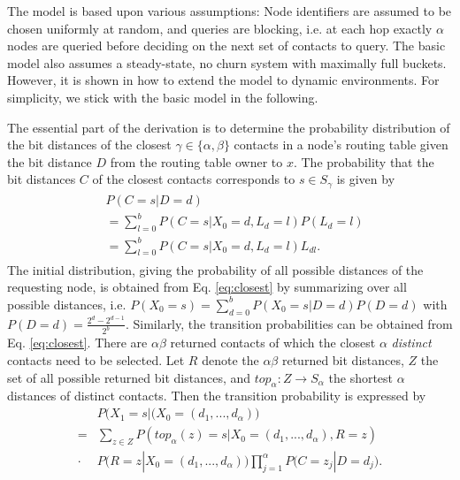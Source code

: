 \documentclass[10pt, conference, compsocconf, letterpaper]{IEEEtran}
\begin{document}
The model is based upon various assumptions: Node identifiers are assumed to be chosen uniformly at random,
and queries are blocking, i.e.  at each hop exactly $\alpha$ nodes are
queried before deciding on the next set of contacts to query.
The basic model also assumes a steady-state, no churn system with
maximally full buckets. 
However, it is shown in \cite{roos13comprehending} how to extend the model
to dynamic environments.
For simplicity, we stick with the basic model in the following.

The essential part of the derivation is to determine the probability distribution
of the bit distances of the closest $\gamma \in \{\alpha, \beta \}$
contacts in a node's routing table given the bit distance $D$ from the routing table owner to $x$.
The probability that the bit distances $C$ of the closest contacts corresponds to $s \in S_\gamma$ is given by
\begin{align}
\label{eq:closest}
\begin{split}
&P(C = s | D = d) \\
&= \sum_{l=0}^bP(C=s|X_0=d,L_d=l)P(L_d=l) \\
&= \sum_{l=0}^b P(C=s|X_0=d,L_d=l)L_{dl}.
\end{split}
\end{align}
The initial distribution, giving the probability of all possible distances of the requesting node, is obtained from Eq. \ref{eq:closest} by summarizing over all possible distances, i.e.
$P(X_0 = s) = \sum_{d=0}^b P(X_0 = s | D = d) P(D=d)$ with $P(D=d)=\frac{2^{d}-2^{d-1}}{2^b}$.
Similarly, the transition probabilities can be obtained from Eq. \ref{eq:closest}.
There are $\alpha\beta$ returned contacts of which the closest $\alpha$
\emph{distinct} contacts need to be selected. Let $R$ denote the
$\alpha\beta$ returned bit distances, 
$Z$ the set of all possible returned bit distances, and 
$top_{\alpha}: Z \rightarrow S_\alpha$  the shortest $\alpha$
distances of distinct contacts.  
Then the transition probability is expressed by
\begin{align}
\label{eq:transition}
&P\big(X_1  = s | 
(X_0 = (d_1, ...,d_\alpha)\big) \nonumber \\
=& \sum_{z \in Z} P(top_\alpha(z)=s|X_0 = (d_1, ...,d_\alpha), R=z)  \\
\cdot &P(R=z | X_0 = (d_1, ...,d_\alpha))  
 \prod_{j=1}^\alpha P\Big(C=z_j| D=d_j\Big) \nonumber.
\end{align}
 
\end{document}
